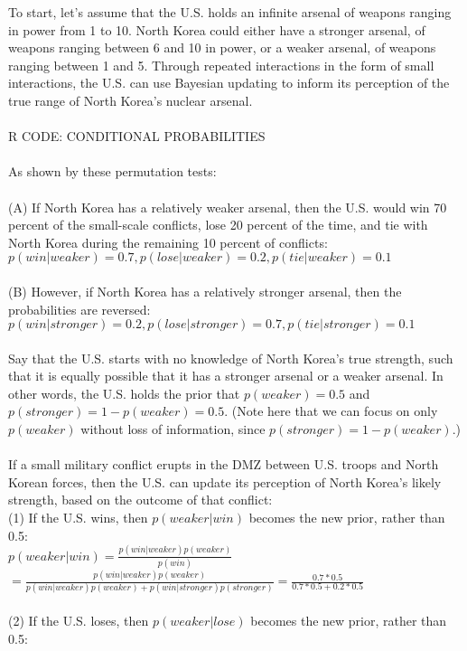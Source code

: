 \documentclass[12pt]{article}
\begin{document}
To start, let's assume that the U.S. holds an infinite arsenal of weapons ranging in power from 1 to 10. North Korea could either have a stronger arsenal, of weapons ranging between 6 and 10 in power, or a weaker arsenal, of weapons ranging between 1 and 5. Through repeated interactions in the form of small interactions, the U.S. can use Bayesian updating to inform its perception of the true range of North Korea's nuclear arsenal.\\
\\
R CODE: CONDITIONAL PROBABILITIES\\
\\
As shown by these permutation tests:\\
\\
(A) If North Korea has a relatively weaker arsenal, then the U.S. would win 70 percent of the small-scale conflicts, lose 20 percent of the time, and tie with North Korea during the remaining 10 percent of conflicts: $p(win | weaker) = 0.7, p(lose | weaker) = 0.2, p(tie | weaker) = 0.1$\\
\\
(B) However, if North Korea has a relatively stronger arsenal, then the probabilities are reversed: $p(win | stronger) = 0.2, p(lose | stronger) = 0.7, p(tie | stronger) = 0.1$\\
\\
Say that the U.S. starts with no knowledge of North Korea's true strength, such that it is equally possible that it has a stronger arsenal or a weaker arsenal. In other words, the U.S. holds the prior that $p(weaker)=0.5$ and $p(stronger)=1-p(weaker)=0.5$. (Note here that we can focus on only  $p(weaker)$ without loss of information, since $p(stronger)=1-p(weaker)$.)\\
\\
If a small military conflict erupts in the DMZ between U.S. troops and North Korean forces, then the U.S. can update its perception of North Korea's likely strength, based on the outcome of that conflict:\\
(1) If the U.S. wins, then $p(weaker | win)$ becomes the new prior, rather than 0.5:\\
$p(weaker | win)= \frac{p(win | weaker) p(weaker)}{p(win)}$\\
$= \frac{p(win | weaker) p(weaker)}{p(win|weaker)p(weaker)+p(win|stronger)p(stronger)} = \frac{0.7*0.5}{0.7*0.5+0.2*0.5}$\\
\\
(2) If the U.S. loses, then $p(weaker | lose)$ becomes the new prior, rather than 0.5:\\
\end{document}
